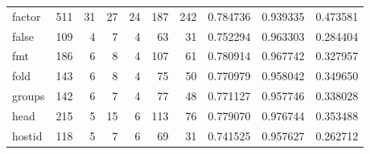 \begin{longtable}{lrrrrrrrrr}
factor    &                    511 &                                 31 &                                27 &                               24 &                               187 &                             242 &                                0.784736 &                               0.939335 &                             0.473581 \\
false     &                    109 &                                  4 &                                 7 &                                4 &                                63 &                              31 &                                0.752294 &                               0.963303 &                             0.284404 \\
fmt       &                    186 &                                  6 &                                 8 &                                4 &                               107 &                              61 &                                0.780914 &                               0.967742 &                             0.327957 \\
fold      &                    143 &                                  6 &                                 8 &                                4 &                                75 &                              50 &                                0.770979 &                               0.958042 &                             0.349650 \\
groups    &                    142 &                                  6 &                                 7 &                                4 &                                77 &                              48 &                                0.771127 &                               0.957746 &                             0.338028 \\
head      &                    215 &                                  5 &                                15 &                                6 &                               113 &                              76 &                                0.779070 &                               0.976744 &                             0.353488 \\
hostid    &                    118 &                                  5 &                                 7 &                                6 &                                69 &                              31 &                                0.741525 &                               0.957627 &                             0.262712 \\

\end{longtable}
